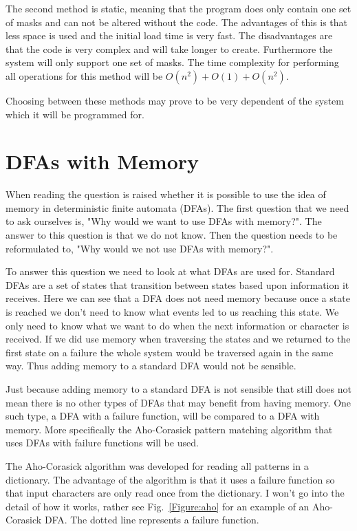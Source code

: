 \documentclass[a4paper,11pt,titlepage]{article}
\begin{document}
The second method is static, meaning that the program does only contain one set of masks and can not be altered without the code. The advantages of this is that less space is used and the initial load time is very fast. The disadvantages are that the code is very complex and will take longer to create. Furthermore the system will only support one set of masks. The time complexity for performing all operations for this method will be $O(n^2)+O(1)+O(n^2)$.

Choosing between these methods may prove to be very dependent of the system which it will be programmed for.

\section{DFAs with Memory}
When reading \cite{art} the question is raised whether it is possible to use the idea of memory in deterministic finite automata (DFAs). The first question that we need to ask ourselves is, "Why would we want to use DFAs with memory?". The answer to this question is that we do not know. Then the question needs to be reformulated to, "Why would we not use DFAs with memory?".

To answer this question we need to look at what DFAs are used for. Standard DFAs are a set of states that transition between states based upon information it receives. Here we can see that a DFA does not need memory because once a state is reached we don't need to know what events led to us reaching this state. We only need to know what we want to do when the next information or character is received. If we did use memory when traversing the states and we returned to the first state on a failure the whole system would be traversed again in the same way. Thus adding memory to a standard DFA would not be sensible.

Just because adding memory to a standard DFA is not sensible that still does not mean there is no other types of DFAs that may benefit from having memory. One such type, a DFA with a failure function, will be compared to a DFA with memory. More specifically the Aho-Corasick pattern matching algorithm that uses DFAs with failure functions will be used.

The Aho-Corasick algorithm was developed for reading all patterns in a dictionary. The advantage of the algorithm is that it uses a failure function so that input characters are only read once from the dictionary. I won't go into the detail of how it works, rather see Fig.~\ref{Figure:aho} for an example of an Aho-Corasick DFA. The dotted line represents a failure function.
\end{document}
